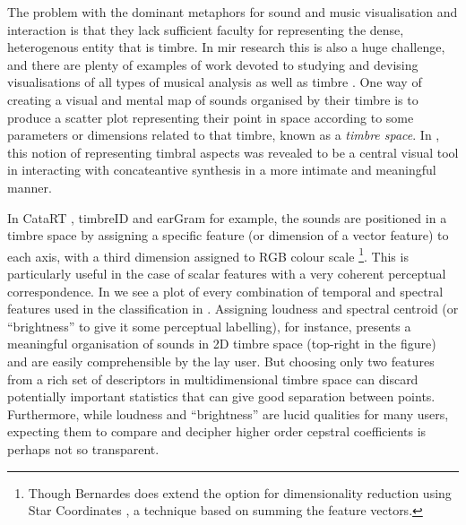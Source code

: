 The problem with the dominant metaphors for sound and music visualisation and interaction is that they lack sufficient faculty for representing the dense, heterogenous entity that is timbre. In \acrshort{mir} research this is also a huge challenge, and there are plenty of examples of work devoted to studying and devising visualisations of all types of musical analysis as well as timbre \citep{Hoashi2009, cooper2006visualization}. One way of creating a visual and mental map of sounds organised by their timbre is to produce a scatter plot representing their point in space according to some parameters or dimensions related to that timbre, known as a \textit{timbre space}. In , this notion of representing timbral aspects was revealed to be a central visual tool in interacting with concateantive synthesis in a more intimate and meaningful manner.

In CataRT \citep{Schwarz2006}, timbreID \citep{Brent2010} and earGram \citep{Bernardes2013} for example, the sounds are positioned in a timbre space by assigning a specific feature (or dimension of a vector feature) to each axis, with a third dimension assigned to RGB colour scale \footnote{Though Bernardes does extend the option for  dimensionality reduction using Star Coordinates \citep{Cooprider2007}, a technique based on summing the feature vectors.}. This is particularly useful in the case of scalar features with a very coherent perceptual correspondence.  In  we see a plot of every combination of temporal and spectral features used in the classification in  . Assigning loudness and spectral centroid (or ``brightness'' to give it some perceptual labelling), for instance, presents a meaningful organisation of sounds in 2D timbre space (top-right in the figure) and are easily comprehensible by the lay user. But choosing only two features from a rich set of descriptors in multidimensional timbre space can discard potentially important statistics that can give good separation between points. Furthermore, while loudness and ``brightness'' are lucid qualities for many users, expecting them to compare and decipher higher order cepstral coefficients is perhaps not so transparent.

